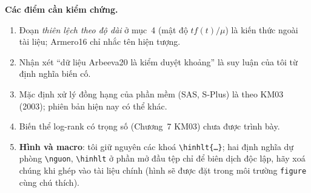 \documentclass[11pt,a4paper,notitlepage]{report}
\begin{document}
\textbf{Các điểm cần kiểm chứng.}
\begin{enumerate}[leftmargin=1.6em,itemsep=2pt]
\item Đoạn \emph{thiên lệch theo độ dài} ở mục~4 (mật độ $tf(t)/\mu$) là kiến thức ngoài tài liệu; Armero16 chỉ nhắc tên hiện tượng.
\item Nhận xét ``dữ liệu Arbeeva20 là kiểm duyệt khoảng'' là suy luận của tôi từ định nghĩa biến cố.
\item Mặc định xử lý đồng hạng của phần mềm (SAS, S-Plus) là theo KM03 (2003); phiên bản hiện nay có thể khác.
\item Biến thể log-rank có trọng số (Chương~7 KM03) chưa được trình bày.
\item \textbf{Hình và macro}: tôi giữ nguyên các khoá \texttt{\textbackslash hinhlt\{\dots\}}; hai định nghĩa dự phòng \texttt{\textbackslash nguon}, \texttt{\textbackslash hinhlt} ở phần mở đầu tệp chỉ để biên dịch độc lập, hãy xoá chúng khi ghép vào tài liệu chính (hình sẽ được đặt trong môi trường \texttt{figure} cùng chú thích).
\end{enumerate}



\end{document}

